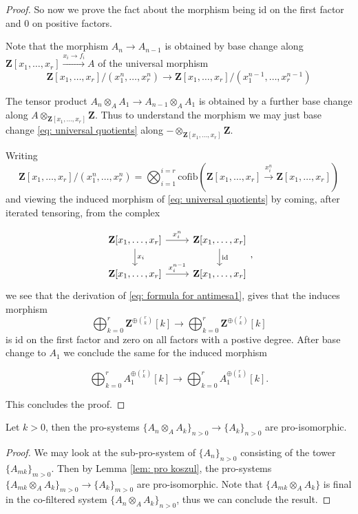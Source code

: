 \documentclass[10pt,reqno]{amsart}
\numberwithin{equation}{section}
\newcommand{\ZZ}{\mathbf{Z}}
\newcommand{\id}{\mathrm{id}}
\newcommand{\cofib}{\mathrm{cofib}}
\begin{document}
\begin{proof}
So now we prove the fact about the morphism being $\id$ on the first factor and $0$ on positive factors.

Note that the morphism $A_n\to A_{n-1}$ is obtained by base change along $\ZZ[x_1,\ldots, x_r]\xrightarrow{x_i\to f_i} A$ of the universal morphism 
\begin{equation}\label{eq: universal quotients}
  \ZZ[x_1,\ldots, x_r]/(x_1^n,\ldots, x_r^n)\to \ZZ[x_1,\ldots, x_r]/(x_1^{n-1},\ldots, x_r^{n-1})  
\end{equation}


The tensor product $A_n\otimes_A A_1\to A_{n-1}\otimes_A A_1$ is obtained by a further base change along $A\otimes_{\ZZ[x_1,\ldots, x_r]} \ZZ$. Thus to understand the morphism we may just base change \ref{eq: universal quotients} along $-\otimes_{\ZZ[x_1,\ldots, x_r]} \ZZ$.

Writing $$\ZZ[x_1,\ldots, x_r]/(x_1^n,\ldots, x_r^n)=\bigotimes_{i=1}^{i=r}\cofib(\ZZ[x_1,\ldots, x_r]\xrightarrow{x_i^n} \ZZ[x_1,\ldots, x_r])$$ and viewing the induced morphism of \ref{eq: universal quotients} by coming, after iterated tensoring, from the complex

$$%
\begin{tikzcd}
{\ZZ[x_1,\ldots, x_r]} \arrow[r, "x_i^n"] \arrow[d, "x_i"] & {\ZZ[x_1,\ldots, x_r]} \arrow[d, "\id"] \\
{\ZZ[x_1,\ldots, x_r]} \arrow[r, "x_i^{n-1}"]              & {\ZZ[x_1,\ldots, x_r]}                 
\end{tikzcd},$$ we see that the derivation of \ref{eq: formula for antimesa1}, gives that the induces morphism $$\bigoplus_{k=0}^{r}\ZZ^{\oplus \binom{r}{k}}[k]\to \bigoplus_{k=0}^{r}\ZZ^{\oplus \binom{r}{k}}[k]$$ is $\id$ on the first factor and zero on all factors with a postive degree. After base change to $A_1$ we conclude the same for the induced morphism  

$$\bigoplus_{k=0}^{r} A_1^{\oplus \binom{r}{k} }[k]\to \bigoplus_{k=0}^{r} A_1^{\oplus \binom{r}{k} }[k].$$

This concludes the proof.


\end{proof}

\begin{corollary}
    Let $k>0$, then the pro-systems $\{A_n\otimes_A A_k\}_{n>0}\to \{A_k\}_{n>0}$ are pro-isomorphic.
\end{corollary}
\begin{proof}
    We may look at the sub-pro-system of $\{A_n\}_{n>0}$ consisting of the tower $\{A_{mk}\}_{m>0}$. Then by Lemma \ref{lem: pro koszul}, the pro-systems $\{A_{mk}\otimes_A A_k\}_{m>0}\to \{A_k\}_{m>0}$ are pro-isomorphic. 
    Note that $\{A_{mk}\otimes_A A_k\}$ is final in the co-filtered system $\{A_{n}\otimes_A A_k\}_{n>0}$, thus we can conclude the result.
\end{proof}
\end{document}
